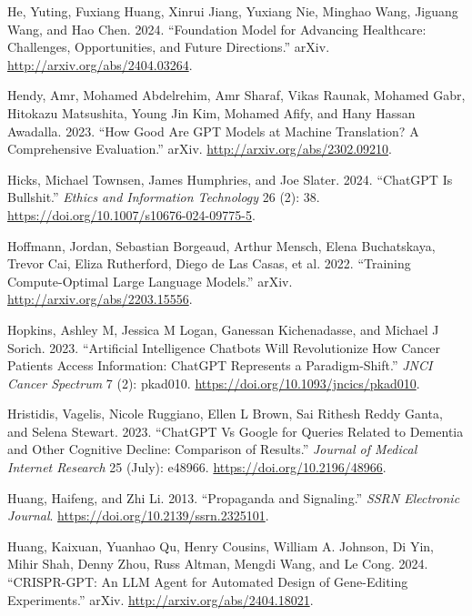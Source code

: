 \documentclass[
  Letterpaper,
]{scrbook}
\newlength{\cslhangindent}
\newenvironment{CSLReferences}[2] %
 {\begin{list}{}{%
  \setlength{\itemindent}{0pt}
  \setlength{\leftmargin}{0pt}
  \setlength{\parsep}{0pt}
  \ifodd #1
   \setlength{\leftmargin}{\cslhangindent}
   \setlength{\itemindent}{-1\cslhangindent}
  \fi
  \setlength{\itemsep}{#2\baselineskip}}}
 {\end{list}}
\begin{document}
\begin{CSLReferences}{1}{0}
He, Yuting, Fuxiang Huang, Xinrui Jiang, Yuxiang Nie, Minghao Wang,
Jiguang Wang, and Hao Chen. 2024. {``Foundation {Model} for {Advancing}
{Healthcare}: {Challenges}, {Opportunities}, and {Future}
{Directions}.''} arXiv. \url{http://arxiv.org/abs/2404.03264}.

Hendy, Amr, Mohamed Abdelrehim, Amr Sharaf, Vikas Raunak, Mohamed Gabr,
Hitokazu Matsushita, Young Jin Kim, Mohamed Afify, and Hany Hassan
Awadalla. 2023. {``How {Good} {Are} {GPT} {Models} at {Machine}
{Translation}? {A} {Comprehensive} {Evaluation}.''} arXiv.
\url{http://arxiv.org/abs/2302.09210}.

Hicks, Michael Townsen, James Humphries, and Joe Slater. 2024.
{``{ChatGPT} Is Bullshit.''} \emph{Ethics and Information Technology} 26
(2): 38. \url{https://doi.org/10.1007/s10676-024-09775-5}.

Hoffmann, Jordan, Sebastian Borgeaud, Arthur Mensch, Elena Buchatskaya,
Trevor Cai, Eliza Rutherford, Diego de Las Casas, et al. 2022.
{``Training {Compute}-{Optimal} {Large} {Language} {Models}.''} arXiv.
\url{http://arxiv.org/abs/2203.15556}.

Hopkins, Ashley M, Jessica M Logan, Ganessan Kichenadasse, and Michael J
Sorich. 2023. {``Artificial Intelligence Chatbots Will Revolutionize How
Cancer Patients Access Information: {ChatGPT} Represents a
Paradigm-Shift.''} \emph{JNCI Cancer Spectrum} 7 (2): pkad010.
\url{https://doi.org/10.1093/jncics/pkad010}.

Hristidis, Vagelis, Nicole Ruggiano, Ellen L Brown, Sai Rithesh Reddy
Ganta, and Selena Stewart. 2023. {``{ChatGPT} Vs {Google} for {Queries}
{Related} to {Dementia} and {Other} {Cognitive} {Decline}: {Comparison}
of {Results}.''} \emph{Journal of Medical Internet Research} 25 (July):
e48966. \url{https://doi.org/10.2196/48966}.

Huang, Haifeng, and Zhi Li. 2013. {``Propaganda and {Signaling}.''}
\emph{SSRN Electronic Journal}.
\url{https://doi.org/10.2139/ssrn.2325101}.

Huang, Kaixuan, Yuanhao Qu, Henry Cousins, William A. Johnson, Di Yin,
Mihir Shah, Denny Zhou, Russ Altman, Mengdi Wang, and Le Cong. 2024.
{``{CRISPR}-{GPT}: {An} {LLM} {Agent} for {Automated} {Design} of
{Gene}-{Editing} {Experiments}.''} arXiv.
\url{http://arxiv.org/abs/2404.18021}.


\end{CSLReferences}
\end{document}
